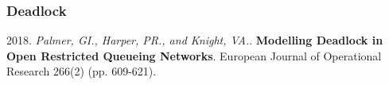 \documentclass[xcolor={table}]{beamer}
\begin{document}
\begin{frame}
\frametitle{Deadlock}
\begin{center}

\end{center}
\scriptsize{\textcolor{textorange}{2018. \textit{Palmer, GI., Harper, PR., and Knight, VA.}. \textbf{Modelling Deadlock in Open Restricted Queueing Networks}. European Journal of Operational Research 266(2) (pp. 609-621).}}
\end{frame}

\begin{frame}
\begin{center}
\centering

\end{center}
\end{frame}

\begin{frame}
\begin{center}

\end{center}
\end{frame}
\end{document}
